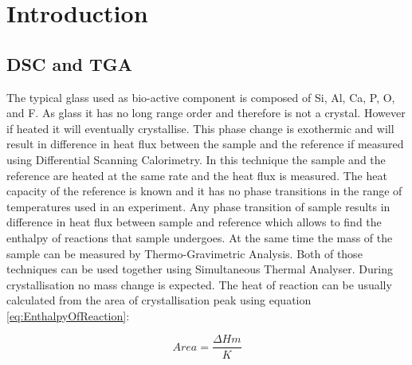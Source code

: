 \documentclass[12pt, a4paper]{article}
\begin{document}
\section{Introduction}

\subsection{DSC and TGA}
The typical glass used as bio-active component is composed of Si, Al, Ca, P, O, and F. As glass it has no long range order and therefore is not a crystal. However if heated it will eventually crystallise. This phase change is exothermic and will result in difference in heat flux between the sample and the reference if measured using Differential Scanning Calorimetry. In this technique the sample and the reference are heated at the same rate and the heat flux is measured. The heat capacity of the reference is known and it has no phase transitions in the range of temperatures used in an experiment. Any phase transition of sample results in difference in heat flux between sample and reference which allows to find the enthalpy of reactions that sample undergoes. At the same time the mass of the sample can be measured by Thermo-Gravimetric Analysis. Both of those techniques can be used together using Simultaneous Thermal Analyser. During crystallisation no mass change is expected. The heat of reaction can be usually calculated from the area of crystallisation peak using equation \ref{eq:EnthalpyOfReaction}: 

\begin{equation}
Area = \frac{\Delta H m}{K}
\label{eq:EnthalpyOfReaction}
\end{equation} 
\end{document}
